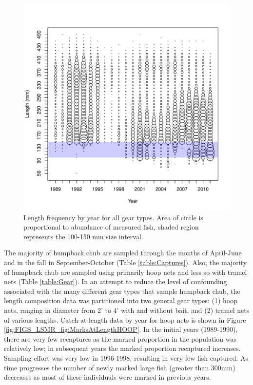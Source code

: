 \begin{figure}[htbp]
	\centering
		\includegraphics[width=6.5in]{../FIGS/LSMR/fig:CaptureLFbubbles.pdf}
	\caption{Length frequency by year for all gear types. Area of circle is proportional to abundance of measured fish, shaded region represents the 100-150 mm size interval.}
	\label{fig:FIGS_LSMR_fig:CaptureLFbubbles}
\end{figure}

The majority of humpback chub are sampled through the months of April-June and in the fall in September-October (Table \ref{table:Captures}).  Also, the majority of humpback chub are sampled using primarily hoop nets and less so with tramel nets (Table \ref{table:Gear}).  In an attempt to reduce the level of confounding associated with the many different gear types that sample humpback chub, the length composition data was partitioned into two general gear types: (1) hoop nets, ranging in diameter from 2' to 4' with and without bait, and (2) tramel nets of various lengths.  Catch-at-length data by year for hoop nets is shown in Figure \ref{fig:FIGS_LSMR_fig:MarksAtLengthHOOP}.  In the initial years (1989-1990), there are very few recaptures as the marked proportion in the population was relatively low; in subsequent years the marked proportion recaptured increases.  Sampling effort was very low in 1996-1998, resulting in very few fish captured. As time progresses the number of newly marked large fish (greater than 300mm) decreases as most of these individuals were marked in previous years.

